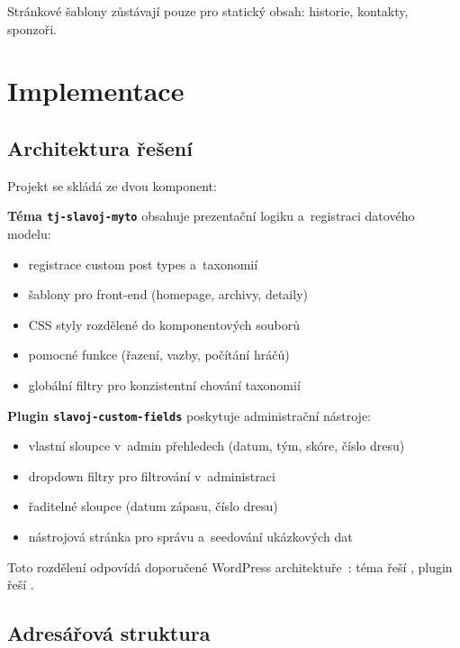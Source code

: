 \documentclass[12pt,a4paper]{article}
\begin{document}
Stránkové šablony zůstávají pouze pro statický obsah: historie, kontakty, sponzoři.

\clearpage
\section{Implementace}

\subsection{Architektura řešení}

Projekt se skládá ze dvou komponent:

\textbf{Téma \texttt{tj-slavoj-myto}} obsahuje prezentační logiku a~registraci datového modelu:

\begin{itemize}
    \item registrace custom post types a~taxonomií
    \item šablony pro front-end (homepage, archivy, detaily)
    \item CSS styly rozdělené do komponentových souborů
    \item pomocné funkce (řazení, vazby, počítání hráčů)
    \item globální filtry pro konzistentní chování taxonomií
\end{itemize}

\textbf{Plugin \texttt{slavoj-custom-fields}} poskytuje administrační nástroje:

\begin{itemize}
    \item vlastní sloupce v~admin přehledech (datum, tým, skóre, číslo dresu)
    \item dropdown filtry pro filtrování v~administraci
    \item řaditelné sloupce (datum zápasu, číslo dresu)
    \item nástrojová stránka pro správu a~seedování ukázkových dat
\end{itemize}

Toto rozdělení odpovídá doporučené WordPress architektuře~\cite{wpdev}: téma řeší , plugin řeší .

\subsection{Adresářová struktura}
\end{document}
